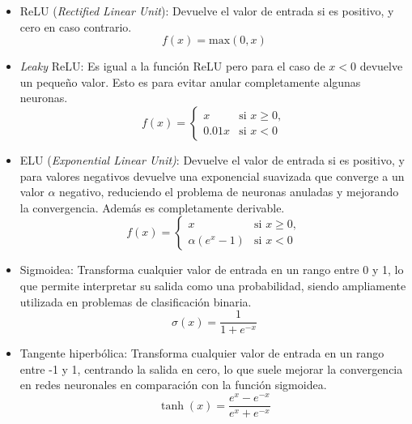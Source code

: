 \begin{itemize}

    \item ReLU (\emph{Rectified Linear Unit}): Devuelve el valor de entrada si es positivo, y cero en caso contrario.
    \begin{equation}
        f(x) = \text{max}(0, x)
    \end{equation}
    
    \item \emph{Leaky} ReLU: Es igual a la función ReLU pero para el caso de $x<0$ devuelve un pequeño valor. Esto es para evitar anular completamente algunas neuronas.
    \begin{equation}
    f(x) = 
        \begin{cases}
        x & \text{si } x \geq 0, \\
        0.01x & \text{si } x < 0
        \end{cases}
    \end{equation}

    \item ELU (\emph{Exponential Linear Unit)}: Devuelve el valor de entrada si es positivo, y para valores negativos devuelve una exponencial suavizada que converge a un valor $\alpha$ negativo, reduciendo el problema de neuronas anuladas y mejorando la convergencia. Además es completamente derivable.
    \begin{equation}
    f(x) = 
        \begin{cases}
        x & \text{si } x \geq 0, \\
        \alpha(e^x - 1) & \text{si } x < 0
        \end{cases}
    \end{equation}
    
    \item Sigmoidea: Transforma cualquier valor de entrada en un rango entre 0 y 1, lo que permite interpretar su salida como una probabilidad, siendo ampliamente utilizada en problemas de clasificación binaria.
    \begin{equation}
        \sigma(x) = \frac{1}{1 + e^{-x}}
    \end{equation}
    
    \item Tangente hiperbólica: Transforma cualquier valor de entrada en un rango entre -1 y 1, centrando la salida en cero, lo que suele mejorar la convergencia en redes neuronales en comparación con la función sigmoidea.
    \begin{equation}
        \tanh(x) = \frac{e^x - e^{-x}}{e^x + e^{-x}}
    \end{equation}

\end{itemize}

